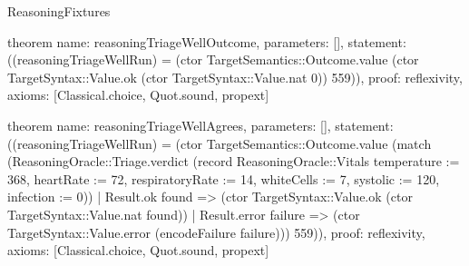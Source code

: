 \begin{lexlean}{ReasoningFixtures}
\begin{semanticmodule}
theorem{
  name: reasoningTriageWellOutcome,
  parameters: [],
  statement: ((reasoningTriageWellRun) = (ctor TargetSemantics::Outcome.value (ctor TargetSyntax::Value.ok (ctor TargetSyntax::Value.nat 0)) 559)),
  proof: reflexivity{},
  axioms: [Classical.choice, Quot.sound, propext]
}

theorem{
  name: reasoningTriageWellAgrees,
  parameters: [],
  statement: ((reasoningTriageWellRun) = (ctor TargetSemantics::Outcome.value (match (ReasoningOracle::Triage.verdict (record ReasoningOracle::Vitals {temperature := 368, heartRate := 72, respiratoryRate := 14, whiteCells := 7, systolic := 120, infection := 0}))
    | Result.ok found => (ctor TargetSyntax::Value.ok (ctor TargetSyntax::Value.nat found))
    | Result.error failure => (ctor TargetSyntax::Value.error (encodeFailure failure))) 559)),
  proof: reflexivity{},
  axioms: [Classical.choice, Quot.sound, propext]
}
\end{semanticmodule}
\end{lexlean}
